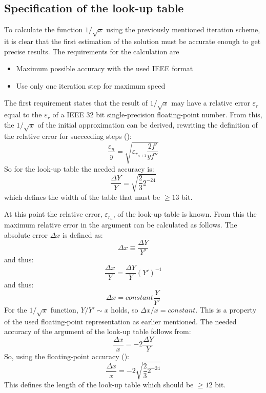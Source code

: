\subsection{Specification of the look-up table}
To calculate the function $1/\sqrt{x}$ using the previously mentioned
iteration scheme, it is clear that the first estimation of the solution must
be accurate enough to get precise results. The requirements for the
calculation are
\begin{itemize}
\item Maximum possible accuracy with the used IEEE format
\item Use only one iteration step for maximum speed
\end{itemize}

The first requirement states that the result of $1/\sqrt{x}$ may have a
relative error $\varepsilon_{r}$ equal to the $\varepsilon_{r}$ of a IEEE 32
bit single-precision floating-point number. From this, the $1/\sqrt{x}$
of the initial approximation can be derived, rewriting the definition of
the relative error for succeeding steps ():
\begin{equation}
\frac{\varepsilon_{n}}{y} =
\sqrt{\varepsilon_ {r_{n+1}} \frac{2f'}{yf''}}
\end{equation}
So for the look-up table the needed accuracy is:
\begin{equation}
\frac{\Delta Y}{Y} = \sqrt{\frac{2}{3} 2^{-24}}
\label{eqn:accy}
\end{equation}
which defines the width of the table that must be $\geq 13$ bit.

At this point the relative error, $\varepsilon_{r_{n}}$, of the look-up table
is known. From this the maximum relative error in the argument can be 
calculated as follows. The absolute error $\Delta x$ is defined as:
\begin{equation}
\Delta x \equiv \frac{\Delta Y}{Y'}
\end{equation}
and thus:
\begin{equation}
\frac{\Delta x}{Y} = \frac{\Delta Y}{Y} (Y')^{-1}
\end{equation}
and thus:
\begin{equation}
\Delta x = constant \frac{Y}{Y'}
\end{equation}
For the $1/\sqrt{x}$ function, $Y / Y' \sim x$ holds, so
$\Delta x / x = constant$. This is a property of the used floating-point
representation as earlier mentioned. The needed accuracy of the argument of the
look-up table follows from:
\begin{equation}
\frac{\Delta x}{x} = -2 \frac{\Delta Y}{Y}
\end{equation}
So, using the floating-point accuracy ():
\begin{equation}
\frac{\Delta x}{x} = -2 \sqrt{\frac{2}{3} 2^{-24}}
\end{equation}
This defines the length of the look-up table which should be $\geq 12$ bit.

